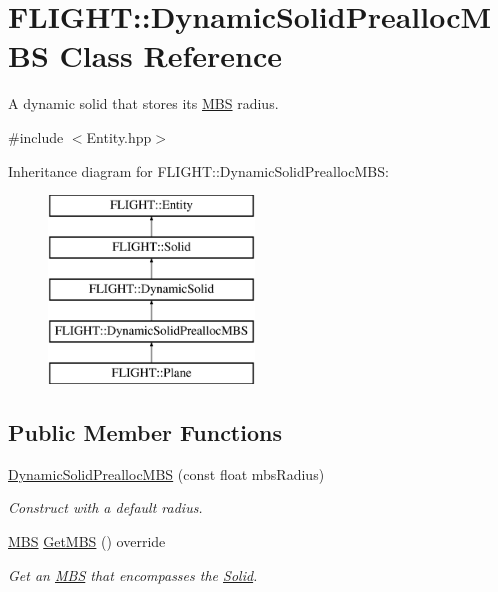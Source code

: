 \hypertarget{class_f_l_i_g_h_t_1_1_dynamic_solid_prealloc_m_b_s}{}\section{F\+L\+I\+G\+HT\+:\+:Dynamic\+Solid\+Prealloc\+M\+BS Class Reference}
\label{class_f_l_i_g_h_t_1_1_dynamic_solid_prealloc_m_b_s}


A dynamic solid that stores it\textquotesingle{}s \hyperlink{class_f_l_i_g_h_t_1_1_m_b_s}{M\+BS} radius.  




{\ttfamily \#include $<$Entity.\+hpp$>$}

Inheritance diagram for F\+L\+I\+G\+HT\+:\+:Dynamic\+Solid\+Prealloc\+M\+BS\+:\begin{figure}[H]
\begin{center}
\leavevmode
\includegraphics[height=5.000000cm]{class_f_l_i_g_h_t_1_1_dynamic_solid_prealloc_m_b_s}
\end{center}
\end{figure}
\subsection*{Public Member Functions}
\begin{DoxyCompactItemize}
\item 
\hyperlink{class_f_l_i_g_h_t_1_1_dynamic_solid_prealloc_m_b_s_a93d8632f202492bc758f246f449264f5}{Dynamic\+Solid\+Prealloc\+M\+BS} (const float mbs\+Radius)
\begin{DoxyCompactList}\small\item\em Construct with a default radius. \end{DoxyCompactList}\item 
\hyperlink{class_f_l_i_g_h_t_1_1_m_b_s}{M\+BS} \hyperlink{class_f_l_i_g_h_t_1_1_dynamic_solid_prealloc_m_b_s_ab509519b0315831b085e5478ce6ea50f}{Get\+M\+BS} () override
\begin{DoxyCompactList}\small\item\em Get an \hyperlink{class_f_l_i_g_h_t_1_1_m_b_s}{M\+BS} that encompasses the \hyperlink{class_f_l_i_g_h_t_1_1_solid}{Solid}. \end{DoxyCompactList}\end{DoxyCompactItemize}


